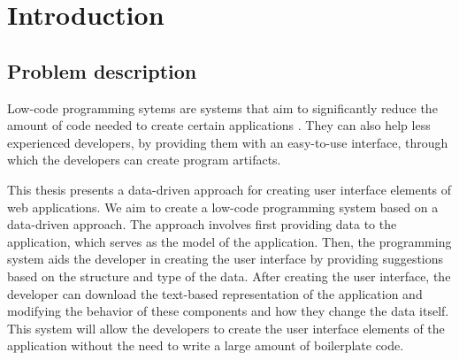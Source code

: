 \chapter*{Introduction}

\section*{Problem description}
Low-code programming sytems are systems that aim to significantly reduce the amount of code needed to create certain applications \cite{Pinho_Aguiar_Amaral_2023}.
They can also help less experienced developers, by providing them with an easy-to-use interface, through which the developers can create program artifacts.

This thesis presents a data-driven approach for creating user interface elements of web applications.
We aim to create a low-code programming system based on a data-driven approach.
The approach involves first providing data to the application, which serves as the model of the application.
Then, the programming system aids the developer in creating the user interface by providing suggestions based on the structure and type of the data.
After creating the user interface, the developer can download the text-based representation of the application and modifying the behavior of these components and how they change the data itself.
This system will allow the developers to create the user interface elements of the application without the need to write a large amount of boilerplate code.

